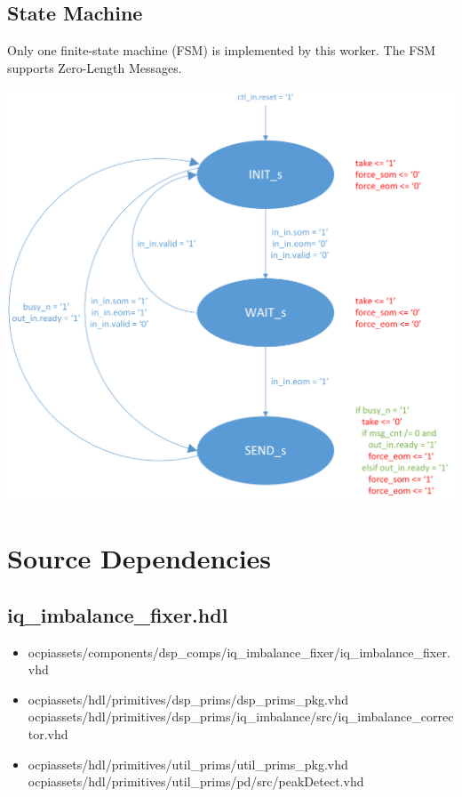 \documentclass{article}
\def\comp{iq\_imbalance\_fixer}
\begin{document}
	\subsection*{State Machine}
	\begin{flushleft}
		Only one finite-state machine (FSM) is implemented by this worker. The FSM supports Zero-Length Messages.
	\end{flushleft}
	{\centering\captionsetup{type=figure}\includegraphics[scale=0.6]{zlm_fsm}\par{}\label{fig:zlm_fsm}}
	\newpage

	\section*{Source Dependencies}
	\subsection*{\comp.hdl}
	\begin{itemize}
		\item ocpiassets/components/dsp\_comps/iq\_imbalance\_fixer/iq\_imbalance\_fixer.vhd
		\item ocpiassets/hdl/primitives/dsp\_prims/dsp\_prims\_pkg.vhd
		      \subitem ocpiassets/hdl/primitives/dsp\_prims/iq\_imbalance/src/iq\_imbalance\_corrector.vhd
		\item ocpiassets/hdl/primitives/util\_prims/util\_prims\_pkg.vhd
		      \subitem ocpiassets/hdl/primitives/util\_prims/pd/src/peakDetect.vhd
	\end{itemize}
\end{document}
